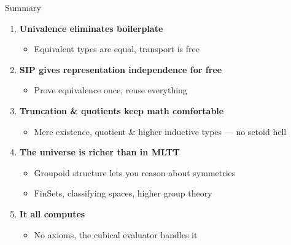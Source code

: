 \documentclass[aspectratio=169,12pt]{beamer}
\begin{document}
\begin{frame}{Summary}
  \begin{enumerate}
    \item[\textbf{1.}] \textbf{Univalence eliminates boilerplate}
    \begin{itemize}
      \item Equivalent types are equal, transport is free
    \end{itemize}
    \pause\medskip
    \item[\textbf{2.}] \textbf{SIP gives representation independence for free}
    \begin{itemize}
      \item Prove equivalence once, reuse everything
    \end{itemize}
    \pause\medskip
    \item[\textbf{3.}] \textbf{Truncation \& quotients keep math comfortable}
    \begin{itemize}
      \item Mere existence, quotient \& higher inductive types --- no setoid hell
    \end{itemize}
    \pause\medskip
    \item[\textbf{4.}] \textbf{The universe is richer than in MLTT}
    \begin{itemize}
      \item Groupoid structure lets you reason about symmetries
      \item FinSets, classifying spaces, higher group theory
    \end{itemize}
    \pause\medskip
    \item[\textbf{5.}] \textbf{It all computes}
    \begin{itemize}
      \item No axioms, the cubical evaluator handles it
    \end{itemize}
  \end{enumerate}
\end{frame}
\end{document}
